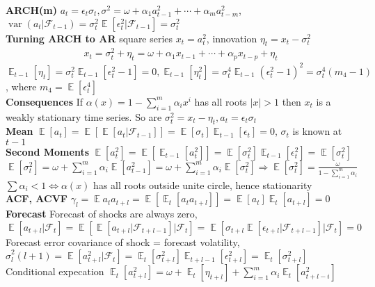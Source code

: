 \documentclass[10pt,landscape, a4paper]{article}
\theoremstyle{remark}
\newcommand{\var}{\operatorname{var}}
\newcommand{\E}{\operatorname{\mathbb{E}}}
\newcommand{\abs}[1]{\left\lvert #1 \right\rvert}
\newcommand{\F}{\mathcal{F}}
\begin{document}
\begin{multicols*}{3}
\textbf{ARCH(m)} $a_t = \epsilon_t \sigma_t, \sigma^2 = \omega + \alpha_1 a^2_{t-1} + \cdots + \alpha_m a^2_{t-m}$, $\var(a_t \lvert \mathcal{F}_{t-1}) = \sigma^2_t \E [\epsilon^2_t \lvert \mathcal{F}_{t-1}] = \sigma^2_t$ \\
\textbf{Turning ARCH to AR} square series $x_t = a^2_t$, innovation $\eta_t = x_t - \sigma^2_t$\\
\vspace{-7pt}
\begin{align*}
    x_t = \sigma^2_t + \eta_t = \omega + \alpha_1 x_{t-1} + \cdots + \alpha_p x_{t-p} + \eta_t
\end{align*}
$\E_{t-1} [\eta_t] = \sigma^2_t \E_{t-1} [\epsilon^2_t -1] = 0, \E_{t-1} [\eta^2_t] = \sigma^4_t \E_{t-1} (\epsilon^2_t -1)^2 = \sigma^4_t (m_4 -1)$, where $m_4 = \E [\epsilon^4_t]$\\
\textbf{Consequences} If $\alpha (x) = 1- \sum^m_{i=1} \alpha_i x^i$ has all roots $\abs{x} >1$ then $x_t$ is a weakly stationary time series. So are $\sigma^2_t = x_t - \eta_t, a_t = \epsilon_t \sigma_t$\\
\textbf{Mean} $\E[a_t] = \E [\E [a_t \lvert \mathcal{F}_{t-1}]] = \E[\sigma_t] \E_{t-1} [\epsilon_t] = 0$, $\sigma_t$ is known at $t-1$\\
\textbf{Second Moments} $\E[a^2_t] = \E [\E_{t-1} [a^2_t]] = \E[\sigma^2_t] \E_{t-1} [\epsilon^2_t] = \E [\sigma^2_t]$\\
$\E [\sigma^2_t] = \omega + \sum^m_{i=1} \alpha_i \E [a^2_{t-1}] = \omega + \sum^m_{i=1} \alpha_i \E [\sigma^2_t] \Rightarrow \E[\sigma^2_t] = \frac{\omega}{1-\sum^m_{i=1} \alpha_i}$\\
$\sum \alpha_i < 1 \Leftrightarrow \alpha(x)$ has all roots outside unite circle, hence stationarity\\
\textbf{ACF, ACVF} $\gamma_l = \E{a_t a_{t+l}} = \E [\E_t [a_t a_{t+l}]] = \E [a_t] \E_t [a_{t+l}] = 0$\\
\textbf{Forecast} Forecast of shocks are always zero,
$\E [a_{t+l} \lvert \F_t] = \E [\E [a_{t+l} \lvert \F_{t+l-1}] \lvert \F_{t}] = \E [\sigma_{t+l} \E [\epsilon_{t+l} \lvert \F_{t+l-1}] \lvert \F_t ] = 0$\\
Forecast error covariance of shock = forecast volatility,
$\hat{\sigma}^2_l (l+1) = \E [a^2_{t+l} \lvert \F_t] = \E_t [\sigma^2_{t+l}] \E_{t+l-1} [\epsilon^2_{t+l}] = \E_t [\sigma^2_{t+l}]$\\
Conditional expecation $\E_t [a^2_{t+l}] = \omega + \E_t [\eta_{t+l}] + \sum^m_{i=1} \alpha_i \E_t [a^2_{t+l-i}]$\\

\end{multicols*}
\end{document}
